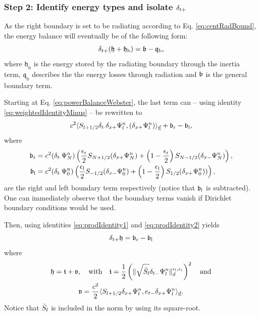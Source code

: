 {\subsubsection{Step 2: Identify energy types and isolate $\delta_{t+}$} 
As the right boundary is set to be radiating according to Eq. \eqref{eq:centRadBound}, the energy balance will eventually be of the following form:
\begin{equation}\label{eq:radiatingEnergyForm}
    \delta_{t+}(\mathfrak{h}+\mathfrak{h}_\text{b}) = \mathfrak{b}-\mathfrak{q}_\text{b},
\end{equation}
where $\mathfrak{h}_\text{b}$ is the energy stored by the radiating boundary through the inertia term, $\mathfrak{q}_\text{b}$ describes the the energy losses through radiation and $\mathfrak{b}$ is the general boundary term.

Starting at Eq. \eqref{eq:powerBalanceWebster}, the last term can -- using identity \eqref{eq:weightedIdentityMinus} -- be rewritten to
\begin{equation*}
    c^2\langle S_{l+1/2} \delta_{t\cdot} \delta_{x+} \Psi_l^n, (\delta_{x+} \Psi_l^n)\rangle_{\underline{d}} + \mathfrak{b}_\text{r} - \mathfrak{b}_\text{l},
\end{equation*}
where
\begin{subequations}
    \begin{align}
     \mathfrak{b}_\text{r} &= c^2(\delta_{t\cdot}\Psi_N^n)\left(\frac{\epsilon_\text{r}}{2}S_{N+1/2}(\delta_{x+} \Psi_N^n) + \left(1-\frac{\epsilon_\text{r}}{2}\right)S_{N-1/2}(\delta_{x-}\Psi_N^n)\right), \\
     \mathfrak{b}_\text{l} &= c^2(\delta_{t\cdot}\Psi_0^n)\left(\frac{\epsilon_\text{l}}{2}S_{-1/2}(\delta_{x-}\Psi_0^n)+\left(1-\frac{\epsilon_\text{l}}{2}\right)S_{1/2}(\delta_{x+} \Psi_0^n))\right),
    \end{align}
\end{subequations}
are the right and left boundary term respectively (notice that $\mathfrak{b}_\text{l}$ is subtracted). One can immediately observe that the boundary terms vanish if Dirichlet boundary conditions would be used. 
    
Then, using identities \eqref{eq:prodIdentity1} and \eqref{eq:prodIdentity2} yields 
\begin{equation*}
    \delta_{t+} \mathfrak{h} = \mathfrak{b}_\text{r} - \mathfrak{b}_\text{l}
\end{equation*}
where
\begin{equation}\label{eq:energyBalanceWebster}
    \begin{gathered}
        \mathfrak{h} = \mathfrak{t} + \mathfrak{v}, \quad \text{with} \quad \mathfrak{t} = \frac{1}{2} \left(\lVert\sqrt{\bar{S}_l} \delta_{t-} \Psi_l^n \rVert_d^{\epsilon_\text{l}, \epsilon_\text{r}}\right)^2 \quad \text{and} \\
        \mathfrak{v} = \frac{c^2}{2}\langle S_{l+1/2}\delta_{x+} \Psi_l^n, e_{t-}\delta_{x+}\Psi_l^n\rangle_{\underline{d}}.
    \end{gathered}
\end{equation}
Notice that $\bar{S}_l$ is included in the norm by using its square-root.

}
